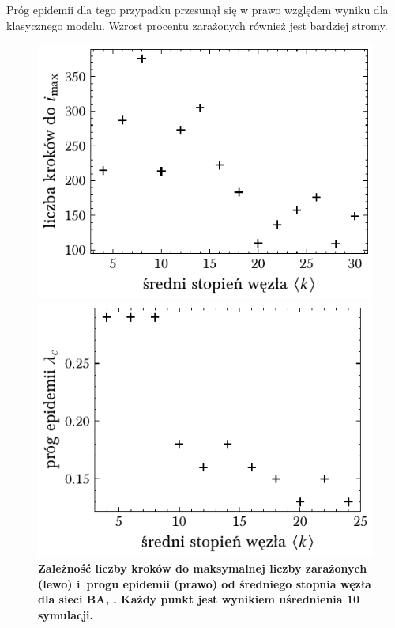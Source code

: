 \documentclass[13pt,a4paper]{article}
\begin{document}
\pagebreak

Próg epidemii dla tego przypadku przesunął się w prawo względem wyniku dla klasycznego modelu. Wzrost procentu zarażonych również jest bardziej stromy.

\begin{figure}[ht!]
	\begin{minipage}[t]{0.49\textwidth}
		\centering
		\includegraphics[width=\textwidth]{../figures/beta/ba_tmax_vs_k.pdf}
	\end{minipage}
	\hspace{\fill}
	\begin{minipage}[t]{0.49\textwidth}
		\centering
		\includegraphics[width=\textwidth]{../figures/beta/ba_threshold_vs_k.pdf}
	\end{minipage}
	\caption{\centering\textbf{Zależność liczby kroków do maksymalnej liczby zarażonych (lewo) i progu epidemii (prawo) od średniego stopnia węzła dla sieci BA, . Każdy punkt jest wynikiem uśrednienia 10 symulacji.}}
\end{figure}
\end{document}
